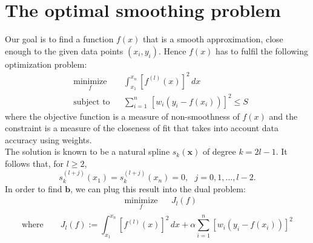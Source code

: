 \section{The optimal smoothing problem} \label{optimal}
Our goal is to find a function $f(x)$ that is a smooth approximation, close enough to the given data points $(x_i,y_i)$. Hence $f(x)$ has to fulfil the following optimization problem:
\begin{equation*} 
\begin{aligned}
& \underset{f}{\text{minimize}}
& & \int_{x_1}^{x_n} [f^{(l)}(x)]^2 \,dx \\
& \text{subject to}
& & \sum\limits_{i=1}^{n} \, [w_i(y_i-f(x_i))]^2 \le S
\end{aligned}
\end{equation*}
where the objective function is a measure of non-smoothness of $f(x)$ and the constraint is a measure of the closeness of fit that takes into account data accuracy using weights. \\
The solution is known to be a natural spline $s_k(\textbf{x})$ of degree $k=2l-1$.
It follows that, for $l \ge 2$,  
\[s_k^{(l+j)}(x_1)=s_k^{(l+j)}(x_n)=0, \ \ \ j=0,1,\dots,l-2.\]
In order to find $\textbf{b}$, we can plug this result into the dual problem:
\begin{equation*} 
\begin{aligned}
& \underset{f}{\text{minimize}}
& &  J_l(f) \\
\end{aligned}
\end{equation*}
\[\text{where} \qquad J_l(f) :=\int_{x_1}^{x_n} [f^{(l)}(x)]^2 \,dx + \alpha \sum\limits_{i=1}^{n}[w_i(y_i-f(x_i))]^2\]

